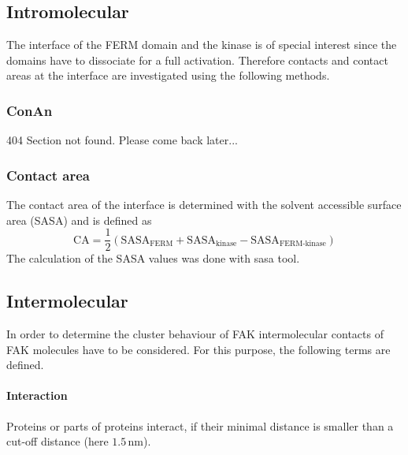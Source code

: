 \subsection{Intromolecular}
The interface of the FERM domain and the kinase is of special interest since the domains have to dissociate for a full activation. Therefore contacts and contact areas at the interface are investigated using the following methods.\\
\subsubsection{ConAn}
404 Section not found. Please come back later...
\subsubsection{Contact area}
The contact area of the interface is determined with the solvent accessible surface area (SASA) and is defined as
\begin{equation}
	\text{CA} = \frac{1}{2} \left(\text{SASA}_\text{FERM} + \text{SASA}_\text{kinase} - \text{SASA}_\text{FERM-kinase}\right)
\end{equation}
The calculation of the SASA values was done with \gromacs{} sasa tool.
\subsection{Intermolecular}
In order to determine the cluster behaviour of FAK intermolecular contacts of FAK molecules have to be considered. For this purpose, the following terms are defined.
\paragraph{Interaction} Proteins or parts of proteins interact, if their minimal distance is smaller than a cut-off distance (here $1.5\,\si{\nano\metre}$).
